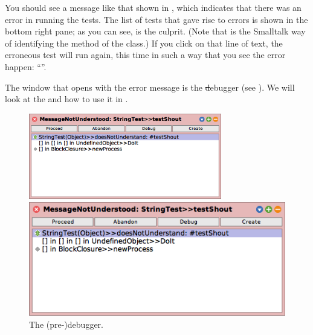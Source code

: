 \documentclass[a4paper,10pt,twoside]{book}
\begin{document}
You should see a message like that shown in , which indicates that there was an error in running the tests.  The list of tests that gave rise to errors is shown in the bottom right pane; as you can see,  is the culprit.
(Note that  is the Smalltalk way of identifying the  method of the  class.)
If you click on that line of text, the erroneous test will run again, this time in such a way that you see the error happen: ``''.

The window that opens with the error message is the \st debugger (see ).
We will look at the  and how to use it in .

\begin{figure}[hbt]
\ifluluelse
	{\centerline {\includegraphics[width=0.75\textwidth]{Predebugger}}}
	{\centerline {\includegraphics[scale=0.7]{Predebugger}}}
\caption{The (pre-)debugger.}
\label{fig:predebugger}
\end{figure}
\end{document}
